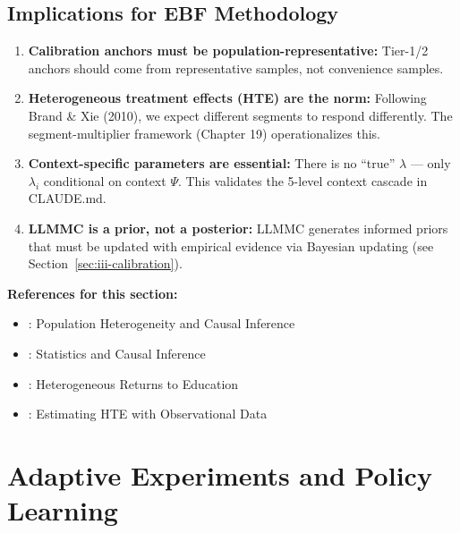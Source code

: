 \subsection{Implications for EBF Methodology}

\begin{enumerate}
\item \textbf{Calibration anchors must be population-representative:}
Tier-1/2 anchors should come from representative samples, not convenience samples.

\item \textbf{Heterogeneous treatment effects (HTE) are the norm:}
Following Brand \& Xie (2010), we expect different segments to respond differently.
The segment-multiplier framework (Chapter 19) operationalizes this.

\item \textbf{Context-specific parameters are essential:}
There is no ``true'' $\lambda$ --- only $\lambda_{i}$ conditional on context $\Psi$.
This validates the 5-level context cascade in CLAUDE.md.

\item \textbf{LLMMC is a prior, not a posterior:}
LLMMC generates informed priors that must be updated with empirical evidence
via Bayesian updating (see Section~\ref{sec:iii-calibration}).
\end{enumerate}

\textbf{References for this section:}
\begin{itemize}[nosep]
\item \citet{xie2013population}: Population Heterogeneity and Causal Inference
\item \citet{holland1986statistics}: Statistics and Causal Inference
\item \citet{brand2010benefits}: Heterogeneous Returns to Education
\item \citet{xie2012estimating}: Estimating HTE with Observational Data
\end{itemize}



\section{Adaptive Experiments and Policy Learning}
\label{sec:iii-adaptive}

